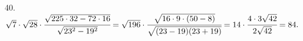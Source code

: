 40. $\sqrt{7}\cdot\sqrt{28}\cdot\cfrac{\sqrt{225\cdot32-72\cdot16}}{\sqrt{23^2-19^2}}=
\sqrt{196}\cdot\cfrac{\sqrt{16\cdot9\cdot(50-8)}}{\sqrt{(23-19)(23+19)}}=14\cdot\cfrac{4\cdot3\sqrt{42}}{2\sqrt{42}}=84.$\\
